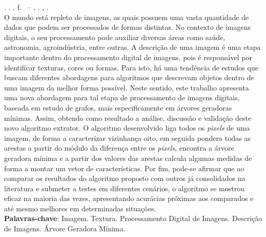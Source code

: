 
\begin{resumo}[RESUMO]
\begin{SingleSpacing}

\imprimirautorcitacao. \imprimirtitulo. \imprimirdata. \pageref {LastPage} f. \imprimirprojeto\ – \imprimirprograma, \imprimirinstituicao. \imprimirlocal, \imprimirdata.\\

O mundo está repleto de imagens, as quais possuem uma vasta quantidade de dados que podem ser processados de formas distintas. No contexto de imagens digitais, o seu processamento pode auxiliar diversas áreas como saúde, astronomia, agroindústria, entre outras. A descrição de uma imagem é uma etapa importante dentro do processamento digital de imagens, pois é responsável por identificar texturas, cores ou formas. Para isto, há uma tendência de estudos que buscam diferentes abordagens para algoritmos que descrevam objetos dentro de uma imagem da melhor forma possível. Neste sentido, este trabalho apresenta uma nova abordagem para tal etapa de processamento de imagens digitais, baseada em estudo de grafos, mais especificamente em árvores geradoras mínimas. Assim, obtendo como resultado a análise, discussão e validação deste novo algoritmo extrator. O algoritmo desenvolvido liga todos os \textit{pixels} de uma imagem, de forma a caracterizar vizinhança oito, em seguida pondera todas as arestas a partir do módulo da diferença entre os \textit{pixels}, encontra a árvore geradora mínima e a partir dos valores das arestas calcula algumas medidas de forma a montar um vetor de características. Por fim, pode-se afirmar que ao comparar os resultados do algoritmo proposto com outros já consolidados na literatura e submeter a testes em diferentes cenários, o algoritmo se mostrou eficaz na maioria das vezes, apresentando acurácias próximas aos comparados e até mesmo melhores em determinadas situações.
\\

\textbf{Palavras-chave}: Imagem.  Textura. Processamento Digital de Imagens. Descrição de Imagens. Árvore Geradora Mínima.

\end{SingleSpacing}
\end{resumo}

